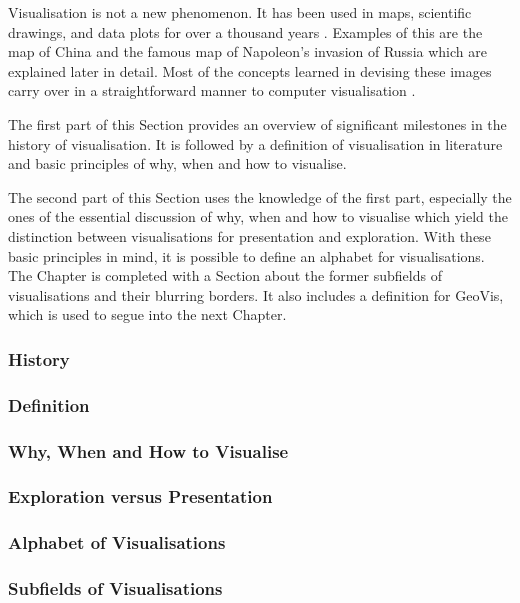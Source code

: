 Visualisation is not a new phenomenon. It has been used in maps, scientific drawings, and data plots for over a thousand years . Examples of this are the map of China and the famous map of Napoleon's invasion of Russia which are explained later in detail. Most of the concepts learned in devising these images carry over in a straightforward manner to computer visualisation .

The first part of this Section provides an overview of significant milestones in the history of visualisation. It is followed by a definition of visualisation in literature and basic principles of why, when and how to visualise.

\cbstart
The second part of this Section uses the knowledge of the first part, especially the ones of the essential discussion of why, when and how to visualise which yield the distinction between visualisations for presentation and exploration. With these basic principles in mind, it is possible to define an alphabet for visualisations. The Chapter is completed with a Section about the former subfields of visualisations and their blurring borders. It also includes a definition for \acl{GeoVis}, which is used to segue into the next Chapter.
\cbend

\subsubsection{History}
\label{s:history}


\subsubsection{Definition}
\label{s:definition}


\subsubsection{Why, When and How to Visualise}
\label{s:basics}


\subsubsection{Exploration versus Presentation}
\label{s:eda}


\subsubsection{Alphabet of Visualisations}


\subsubsection{Subfields of Visualisations}

